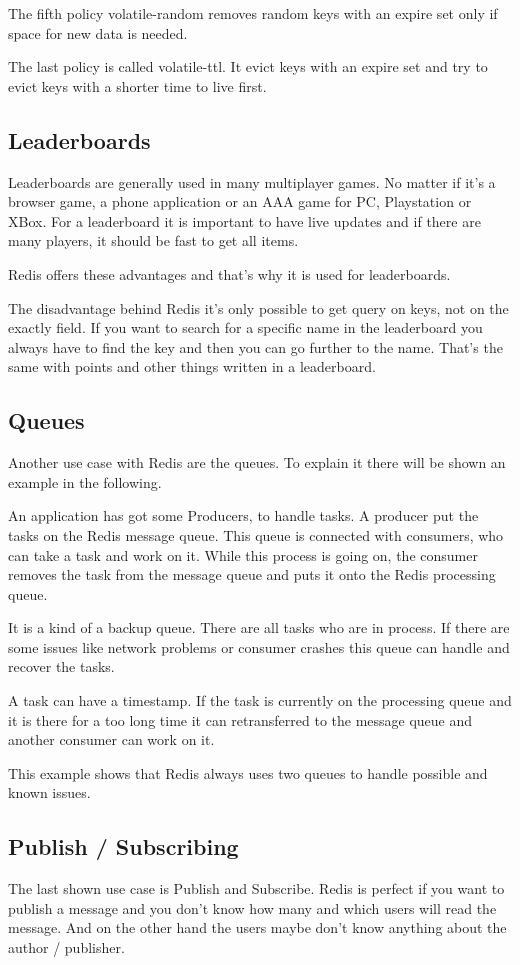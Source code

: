 The fifth policy \grqq volatile-random\grqq{ } removes random keys with an expire set only if space for new data is needed.

The last policy is called volatile-ttl. It evict keys with an expire set and try to evict keys with a shorter time to live first.\cite{RedisLabsLRU}
\subsection{Leaderboards}
Leaderboards are generally used in many multiplayer games. No matter if it’s a browser game, a phone application or an AAA game for PC, Playstation or XBox. For a leaderboard it is important to have live updates and if there are many players, it should be fast to get all items.

Redis offers these advantages and that’s why it is used for leaderboards.

The disadvantage behind Redis it’s only possible to get query on keys, not on the exactly field. If you want to search for a specific name in the leaderboard you always have to find the key and then you can go further to the name. That’s the same with points and other things written in a leaderboard.\cite{Socialpoint}
\subsection{Queues}
Another use case with Redis are the queues. To explain it there will be shown an example in the following.

An application has got some Producers, to handle tasks. A producer put the tasks on the Redis message queue. This queue is connected with consumers, who can take a task and work on it. While this process is going on, the consumer removes the task from the message queue and puts it onto the Redis processing queue.

It is a kind of a backup queue. There are all tasks who are in process. If there are some issues like network problems or consumer crashes this queue can handle and recover the tasks.

A task can have a timestamp. If the task is currently on the processing queue and it is there for a too long time it can retransferred to the message queue and another consumer can work on it.

This example shows that Redis always uses two queues to handle possible and known issues.\cite{Sabo}

\subsection{Publish / Subscribing}
The last shown use case is Publish and Subscribe. Redis is perfect if you want to publish a message and you don’t know how many and which users will read the message. And on the other hand the users maybe don’t know anything about the author / publisher.

